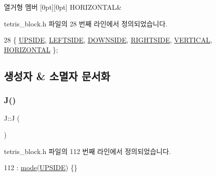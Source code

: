 \begin{DoxyEnumFields}{열거형 멤버}
[0pt][0pt]{}\mbox{\label{class_block_a33a96023993478ad4b52426188454765a883bda1b4a0cb6d25d8b3c3465f0cfef}} 
H\+O\+R\+I\+Z\+O\+N\+T\+AL&\\
\hline

\end{DoxyEnumFields}


tetris\+\_\+block.\+h 파일의 28 번째 라인에서 정의되었습니다.


\begin{DoxyCode}
28 \{ \mbox{\hyperlink{class_block_a33a96023993478ad4b52426188454765a4529e89ca1c08cc5f81181e355719fad}{UPSIDE}}, \mbox{\hyperlink{class_block_a33a96023993478ad4b52426188454765a9c855bf91465e7da98901d7900740919}{LEFTSIDE}}, \mbox{\hyperlink{class_block_a33a96023993478ad4b52426188454765a73fd4ad0ff8642235ec8549f9290d13b}{DOWNSIDE}}, \mbox{\hyperlink{class_block_a33a96023993478ad4b52426188454765a005424e665ea0b83edfaf9ddb3ab85a1}{RIGHTSIDE}}, \mbox{\hyperlink{class_block_a33a96023993478ad4b52426188454765a76628d7877667ccb2f6e549b89466a4a}{VERTICAL}}, 
      \mbox{\hyperlink{class_block_a33a96023993478ad4b52426188454765a883bda1b4a0cb6d25d8b3c3465f0cfef}{HORIZONTAL}} \}; 
\end{DoxyCode}


\subsection{생성자 \& 소멸자 문서화}
\mbox{\label{class_j_ae3dc8b3467ed8bfd545c3b72bc9c3e70}} 
\subsubsection{\texorpdfstring{J()}{J()}}
{\footnotesize\ttfamily J\+::J (\begin{DoxyParamCaption}{ }\end{DoxyParamCaption})\hspace{0.3cm}{\ttfamily [inline]}}



tetris\+\_\+block.\+h 파일의 112 번째 라인에서 정의되었습니다.


\begin{DoxyCode}
112 : \mbox{\hyperlink{class_j_a84f29c2144ce2c8ca0d369060589f0f4}{mode}}(\mbox{\hyperlink{class_block_a33a96023993478ad4b52426188454765a4529e89ca1c08cc5f81181e355719fad}{UPSIDE}}) \{\}
\end{DoxyCode}


